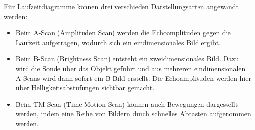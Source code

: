 Für Laufzeitdiagramme können drei verschieden Darstellungsarten angewandt werden:

\begin{itemize}
	\item Beim A-Scan (Amplituden Scan) werden die Echoamplituden gegen die Laufzeit aufgetragen, wodurch sich ein eindimensionales Bild ergibt.
	\item Beim B-Scan (Brightness Scan) entsteht ein zweidimensionales Bild. Dazu wird die Sonde über das Objekt geführt und aus mehreren eindimensionalen A-Scans wird dann sofort ein B-Bild erstellt. Die Echoamplituden werden hier 
	über Helligkeitsabstufungen sichtbar gemacht.
	\item Beim TM-Scan (Time-Motion-Scan) können auch Bewegungen dargestellt werden, indem eine Reihe von Bildern durch schnelles Abtasten aufgenommen werden.
\end{itemize}